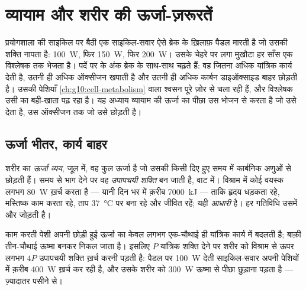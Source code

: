 \chapter{व्यायाम और शरीर की ऊर्जा-ज़रूरतें}\label{ch:g10:exercise-and-energy}

प्रयोगशाला की साइकिल पर बैठी एक साइकिल-सवार ऐसे ब्रेक के ख़िलाफ़ पैडल
मारती है जो उसकी शक्ति नापता है: \qty{100}{W}, फिर \qty{150}{W}, फिर
\qty{200}{W}। उसके चेहरे पर लगा मुखौटा हर साँस एक विश्लेषक तक भेजता है।
पर्दे पर के अंक ब्रेक के साथ-साथ चढ़ते हैं: वह जितना अधिक यांत्रिक कार्य
देती है, उतनी ही अधिक ऑक्सीजन खपाती है और उतनी ही अधिक कार्बन डाइऑक्साइड
बाहर छोड़ती है। उसकी पेशियाँ \cref{ch:g10:cell-metabolism} वाला श्वसन पूरे
ज़ोर से चला रही हैं, और विश्लेषक उसी का बही-खाता पढ़ रहा है। यह अध्याय
व्यायाम की ऊर्जा का पीछा उस भोजन से करता है जो उसे देता है, उस ऑक्सीजन
तक जो उसे छोड़ती है।

\section{ऊर्जा भीतर, कार्य बाहर}

\begin{definition}[ऊर्जा व्यय]\label{def:g10:exercise-and-energy:expenditure}
शरीर का \emph{ऊर्जा व्यय}, जूल में, वह कुल ऊर्जा है जो
उसकी  किसी दिए हुए समय में कार्बनिक अणुओं से छोड़ती हैं। समय से
भाग देने पर वह \emph{उपापचयी शक्ति} बन जाती है, वाट में। विश्राम में कोई
वयस्क लगभग \qty{80}{W} ख़र्च करता है --- यानी दिन भर में क़रीब
\qty{7000}{kJ} --- ताकि हृदय धड़कता रहे, मस्तिष्क काम करता रहे, ताप
\qty{37}{\celsius} पर बना रहे और  जीवित रहें; यही
\emph{आधारी } है। हर गतिविधि उसमें और जोड़ती है।
\end{definition}

\begin{proposition}[ऊर्जा जाती कहाँ है]\label{prop:g10:exercise-and-energy:efficiency}
काम करती पेशी अपनी छोड़ी हुई ऊर्जा का केवल लगभग एक-चौथाई ही यांत्रिक
कार्य में बदलती है; बाक़ी तीन-चौथाई ऊष्मा बनकर निकल जाता है। इसलिए
$P$ यांत्रिक शक्ति देने पर शरीर को विश्राम से ऊपर लगभग $4P$ उपापचयी
शक्ति ख़र्च करनी पड़ती है: पैडल पर \qty{100}{W} देती साइकिल-सवार अपनी
पेशियों में क़रीब \qty{400}{W} ख़र्च कर रही है, और उसके शरीर को
\qty{300}{W} ऊष्मा से पीछा छुड़ाना पड़ता है --- ज़्यादातर पसीने से।
\end{proposition}
\admitted

